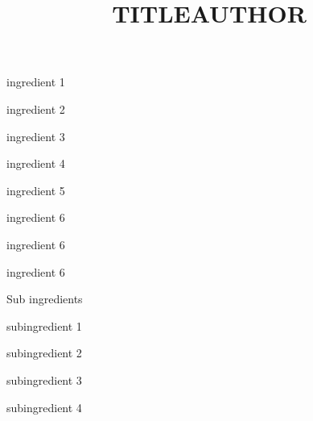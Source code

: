 \title{\textbf{TITLE}\footnotesize{AUTHOR}}

\begin{ingredient}
\begin{main}
\item ingredient 1
\item ingredient 2
\item ingredient 3
\item ingredient 4
\item ingredient 5
\item ingredient 6
\item ingredient 6
\item ingredient 6
\end{main}
\begin{subingredient}{Sub ingredients}
	\item subingredient 1
	\item subingredient 2
	\item subingredient 3
	\item subingredient 4
\end{subingredient}
\end{ingredient} %
\begin{recipe}

\end{recipe}

\begin{notes}

\end{notes}	